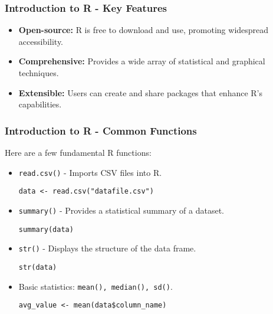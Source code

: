 \documentclass[aspectratio=169]{beamer}
\begin{document}
\begin{frame}[fragile]
    \frametitle{Introduction to R - Key Features}
    \begin{itemize}
        \item \textbf{Open-source:} R is free to download and use, promoting widespread accessibility.
        \item \textbf{Comprehensive:} Provides a wide array of statistical and graphical techniques.
        \item \textbf{Extensible:} Users can create and share packages that enhance R's capabilities.
    \end{itemize}
\end{frame}

\begin{frame}[fragile]
    \frametitle{Introduction to R - Common Functions}
    Here are a few fundamental R functions:
    \begin{itemize}
        \item \texttt{read.csv()} - Imports CSV files into R.
        \begin{lstlisting}
data <- read.csv("datafile.csv")
        \end{lstlisting}
        
        \item \texttt{summary()} - Provides a statistical summary of a dataset.
        \begin{lstlisting}
summary(data)
        \end{lstlisting}
        
        \item \texttt{str()} - Displays the structure of the data frame.
        \begin{lstlisting}
str(data)
        \end{lstlisting}
        
        \item Basic statistics: \texttt{mean(), median(), sd()}.
        \begin{lstlisting}
avg_value <- mean(data$column_name)
        \end{lstlisting}
    \end{itemize}
\end{frame}
\end{document}
